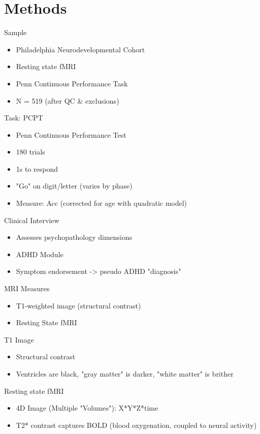 \documentclass[presentation]{beamer}
\begin{document}
\section{Methods}
\label{sec:orgheadline17}
\begin{frame}[label={sec:orgheadline4}]{Sample}
\begin{itemize}
\item Philadelphia Neurodevelopmental Cohort
\item Resting state fMRI
\item Penn Continuous Performance Task
\item N = 519 (after QC \& exclusions)
\end{itemize}
\end{frame}
\begin{frame}[label={sec:orgheadline5}]{Task: PCPT}
\begin{itemize}
\item Penn Continuous Performance Test
\item 180 trials
\item 1s to respond
\item "Go" on digit/letter (varies by phase)
\item Measure: Acc (corrected for age with quadratic model)
\end{itemize}
\end{frame}
\begin{frame}[label={sec:orgheadline6}]{Clinical Interview}
\begin{itemize}
\item Assesses psychopathology dimensions
\item ADHD Module
\item Symptom endorsement -> pseudo ADHD "diagnosis"
\end{itemize}
\end{frame}
\begin{frame}[label={sec:orgheadline7}]{MRI Measures}
\begin{itemize}
\item T1-weighted image (structural contrast)
\item Resting State fMRI
\end{itemize}
\begin{block}{T1 Image}
\begin{itemize}
\item Structural contrast
\item Ventricles are black, "gray matter" is darker, "white matter" is brither
\end{itemize}
\end{block}
\begin{block}{Resting state fMRI}
\begin{itemize}
\item 4D Image (Multiple "Volumes"): X*Y*Z*time
\item T2* contrast captures BOLD (blood oxygenation, coupled to neural activity)
\end{itemize}
\end{block}
\end{frame}
\end{document}
